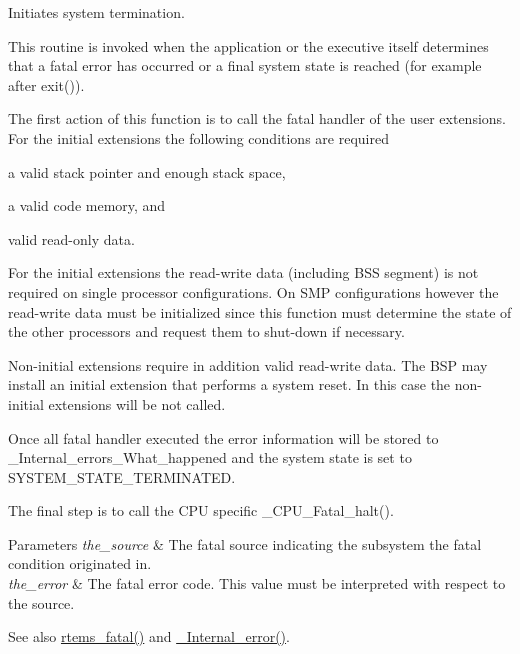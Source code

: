 Initiates system termination. 

This routine is invoked when the application or the executive itself determines that a fatal error has occurred or a final system state is reached (for example after exit()).

The first action of this function is to call the fatal handler of the user extensions. For the initial extensions the following conditions are required
\begin{DoxyItemize}
\item a valid stack pointer and enough stack space,
\item a valid code memory, and
\item valid read-\/only data.
\end{DoxyItemize}

For the initial extensions the read-\/write data (including B\+SS segment) is not required on single processor configurations. On S\+MP configurations however the read-\/write data must be initialized since this function must determine the state of the other processors and request them to shut-\/down if necessary.

Non-\/initial extensions require in addition valid read-\/write data. The B\+SP may install an initial extension that performs a system reset. In this case the non-\/initial extensions will be not called.

Once all fatal handler executed the error information will be stored to \+\_\+\+Internal\+\_\+errors\+\_\+\+What\+\_\+happened and the system state is set to S\+Y\+S\+T\+E\+M\+\_\+\+S\+T\+A\+T\+E\+\_\+\+T\+E\+R\+M\+I\+N\+A\+T\+ED.

The final step is to call the C\+PU specific \+\_\+\+C\+P\+U\+\_\+\+Fatal\+\_\+halt().


\begin{DoxyParams}{Parameters}
{\em the\+\_\+source} & The fatal source indicating the subsystem the fatal condition originated in. \\
\hline
{\em the\+\_\+error} & The fatal error code. This value must be interpreted with respect to the source.\\
\hline
\end{DoxyParams}
\begin{DoxySeeAlso}{See also}
\mbox{\hyperlink{group__ClassicFatal_ga53fa9338246642e0d931f61314c6609e}{rtems\+\_\+fatal()}} and \mbox{\hyperlink{group__RTEMSScoreIntErr_ga092fa4be4bda2528754b494e901d3d2a}{\+\_\+\+Internal\+\_\+error()}}. 
\end{DoxySeeAlso}


